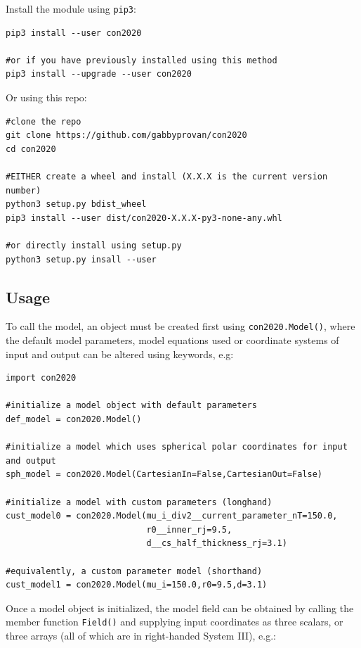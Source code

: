 	Install the module using \texttt{pip3}:
	
	\begin{verbatim}
pip3 install --user con2020
	
#or if you have previously installed using this method
pip3 install --upgrade --user con2020
	\end{verbatim}
	
	Or using this repo:
	
	\begin{verbatim}
#clone the repo
git clone https://github.com/gabbyprovan/con2020
cd con2020
	
#EITHER create a wheel and install (X.X.X is the current version number)
python3 setup.py bdist_wheel
pip3 install --user dist/con2020-X.X.X-py3-none-any.whl
	
#or directly install using setup.py
python3 setup.py insall --user
	\end{verbatim}
	
	\subsection{Usage}
	
	To call the model, an object must be created first using \texttt{con2020.Model()}, where the default model parameters, model equations used or coordinate systems of input and output can be altered using keywords, e.g:
	
	\begin{verbatim}
import con2020
	
#initialize a model object with default parameters
def_model = con2020.Model()
	
#initialize a model which uses spherical polar coordinates for input and output
sph_model = con2020.Model(CartesianIn=False,CartesianOut=False)
	
#initialize a model with custom parameters (longhand)
cust_model0 = con2020.Model(mu_i_div2__current_parameter_nT=150.0,
						   	r0__inner_rj=9.5,
							d__cs_half_thickness_rj=3.1)
	
#equivalently, a custom parameter model (shorthand)
cust_model1 = con2020.Model(mu_i=150.0,r0=9.5,d=3.1)
	\end{verbatim}
	
	Once a model object is initialized, the model field can be obtained by calling the member function \texttt{Field()} and supplying input coordinates as three scalars, or three arrays (all of which are in right-handed System III), e.g.:
	
